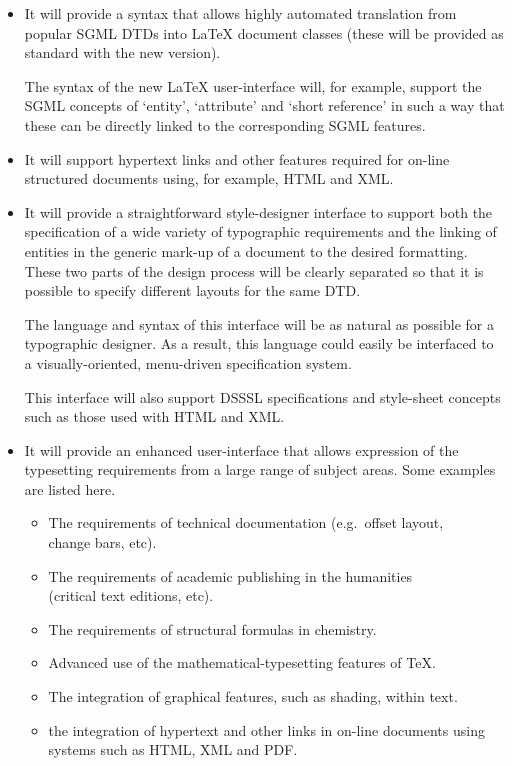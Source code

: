 \documentclass[a4paper]{article}
\newcommand{\eg}{e.g.~}
\newcommand{\SGML}{{\sc SGML}}
\newcommand{\DSSSL}{{\sc DSSSL}}
\newcommand{\HTML}{{\sc HTML}}
\newcommand{\XML}{{\sc XML}}
\newcommand{\PDF}{{\sc PDF}}
\begin{document}
 \begin{itemize}
 \item
 It will provide a syntax that allows highly automated translation
 from popular \SGML{} DTDs into \LaTeX{} document classes (these
 will be provided as standard with the new version).

 The syntax of the new \LaTeX{} user-interface will, for example,
 support the \SGML{} concepts of `entity', `attribute' and `short
 reference' in such a way that these can be directly linked to the
 corresponding  \SGML{} features.

 \item
 It will support hypertext links and other features required for
 on-line structured documents using, for example, \HTML{} and \XML{}.

\item
 It will provide a straightforward style-designer interface to support
 both the specification of a wide variety of typographic requirements
 and the linking of entities in the generic mark-up of a document to
 the desired formatting.  These two parts of the design process will
 be clearly separated so that it is possible to specify different
 layouts for the same DTD.

 The language and syntax of this interface will be as natural as
 possible for a typographic designer.  As a result, this language
 could easily be interfaced to a visually-oriented, menu-driven
 specification system.

 This interface will also support \DSSSL{} specifications and
 style-sheet concepts such as those used with \HTML{} and \XML{}.

 \item
 It will provide an enhanced user-interface that allows expression of
 the typesetting requirements from a large range of subject areas. Some
 examples are listed here.

 \begin{itemize}
 \item The requirements of technical documentation (\eg offset layout,\\
   change bars, etc).
 \item The requirements of academic publishing in the humanities\\
   (critical text editions, etc).
 \item The requirements of structural formulas in chemistry.
 \item Advanced use of the mathematical-typesetting features of \TeX{}.
 \item The integration of graphical features, such as shading,
   within text.
 \item the integration of hypertext and other links in on-line
   documents using systems such as \HTML{}, \XML{} and \PDF{}.


\end{itemize}
\end{itemize}
\end{document}
